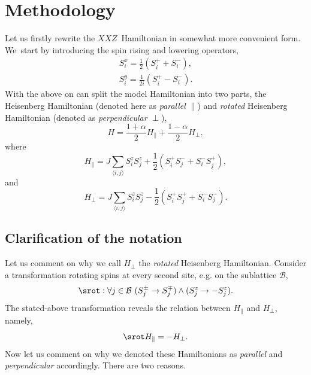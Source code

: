 \documentclass[12pt, a4paper]{article}
\newcommand{\mean}[1]{\langle#1\rangle}
\begin{document}
\section{Methodology}
Let us firstly rewrite the $XXZ$~Hamiltonian in somewhat more convenient form. We~start by introducing the spin rising and lowering operators,
\begin{equation}
\begin{aligned}
S_i^x = \frac{1}{2}\left(S_i^+ + S_i^-\right), \\
S_i^y = \frac{1}{2i}\left(S_i^+ - S_i^-\right).
\end{aligned}
\end{equation}
With the above on can split the model Hamiltonian into two parts, the Heisenberg Hamiltonian (denoted here as \textit{parallel} $\parallel$) and \textit{rotated} Heisenberg Hamiltonian (denoted as \textit{perpendicular} $\perp$),
\begin{equation}\label{eq:H_parts}
H = \frac{1+\alpha}{2} H_{\parallel} + \frac{1-\alpha}{2} H_{\perp},
\end{equation}
where
\begin{equation}\label{eq:H_parallel}
H_{\parallel} = J\sum_{\mean{i,j}}S_i^z S_j^z + \frac{1}{2}\left(S_i^+ S_j^- + S_i^- S_j^+\right),
\end{equation}
and
\begin{equation}\label{eq:H_perpendicular}
H_{\perp} = J\sum_{\mean{i,j}} S_i^z S_j^z - \frac{1}{2}\left(S_i^+ S_j^+ + S_i^- S_j^-\right).
\end{equation}

\subsection{Clarification of the notation}
Let us comment on why we call $H_{\perp}$ the \textit{rotated} Heisenberg Hamiltonian. Consider a transformation rotating spins at every second site, e.g. on the sublattice $\mathcal{B}$,
\begin{equation}
\srot : \forall j\in\mathcal{B} \ (S_j^{\pm} \rightarrow S_j^{\mp}) \land (S_j^{z} \rightarrow -S_j^{z}).
\end{equation}
The stated-above transformation reveals the relation between $H_{\parallel}$ and $H_{\perp}$, namely,
\begin{equation}\label{eq:rot_relation}
\srot H_{\parallel} = -H_{\perp}.
\end{equation}
Now let us comment on why we denoted these Hamiltonians as \textit{parallel} and \textit{perpendicular} accordingly. There are two reasons. 
\end{document}
